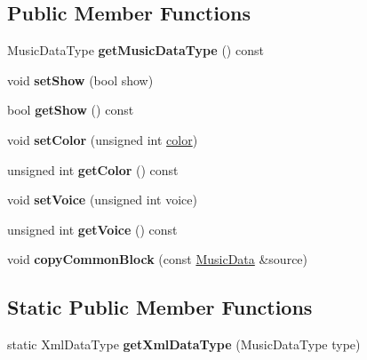 \subsection*{Public Member Functions}
\begin{DoxyCompactItemize}
\item 
\mbox{\label{class_o_v_e_1_1_music_data_a0b845059fdd197334ae8351be2361809}} 
Music\+Data\+Type {\bfseries get\+Music\+Data\+Type} () const
\item 
\mbox{\label{class_o_v_e_1_1_music_data_a079252c2e99b01735eb2f30984a294e5}} 
void {\bfseries set\+Show} (bool show)
\item 
\mbox{\label{class_o_v_e_1_1_music_data_ab9da87334787eb524c4b33c6d9f68436}} 
bool {\bfseries get\+Show} () const
\item 
\mbox{\label{class_o_v_e_1_1_music_data_a269b9af34dfd91fc6cf1f2be8cca97c3}} 
void {\bfseries set\+Color} (unsigned int \hyperlink{structcolor}{color})
\item 
\mbox{\label{class_o_v_e_1_1_music_data_af399c96877cc507c5142057bb1bfd374}} 
unsigned int {\bfseries get\+Color} () const
\item 
\mbox{\label{class_o_v_e_1_1_music_data_a13cdfdb507707f0132dc01b4f007fd3b}} 
void {\bfseries set\+Voice} (unsigned int voice)
\item 
\mbox{\label{class_o_v_e_1_1_music_data_aed470bf7796e7eb8bd772fe92c285b61}} 
unsigned int {\bfseries get\+Voice} () const
\item 
\mbox{\label{class_o_v_e_1_1_music_data_a759b78e04e6ba4bdc4b2779174f5aa3f}} 
void {\bfseries copy\+Common\+Block} (const \hyperlink{class_o_v_e_1_1_music_data}{Music\+Data} \&source)
\end{DoxyCompactItemize}
\subsection*{Static Public Member Functions}
\begin{DoxyCompactItemize}
\item 
\mbox{\label{class_o_v_e_1_1_music_data_acbe59d3a955b4bcaee3251a5e2e9e416}} 
static Xml\+Data\+Type {\bfseries get\+Xml\+Data\+Type} (Music\+Data\+Type type)
\end{DoxyCompactItemize}
